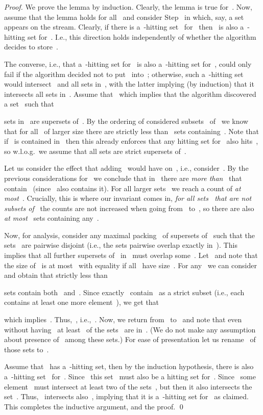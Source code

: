 \documentclass[draft,a4paper]{llncs}
\begin{document}
\begin{proof}
We prove the lemma by induction. Clearly, the lemma is true for~. Now, assume that the lemma holds for all~ and consider Step~ in which, say, a set~ appears on the stream.
Clearly, if there is a~-hitting set~ for~ then~ is also a~-hitting set for~. I.e., this direction holds independently of whether the algorithm decides to store~.

The converse, i.e., that a~-hitting set for~ is also a~-hitting set for~, could only fail if the algorithm decided not to put~ into~; otherwise, such a~-hitting set~ would intersect~ and all sets in~, with the latter implying (by induction) that it intersects all sets in~. Assume that~ which implies that the algorithm discovered a set~ such that

sets in~ are supersets of~. By the ordering of considered subsets~ of~ we know that for all~ of larger size there are strictly less than~ sets containing~. Note that if~ is contained in~ then this already enforces that any hitting set for~ also hits~, so w.l.o.g.\ we assume that all sets are strict supersets of~.

Let us consider the effect that adding~ would have on~, i.e., consider~. By the previous considerations for~ we conclude that in~ there are \emph{more than}~ that contain~ (since~ also contains it). For all larger sets~ we reach a count of \emph{at most}~. Crucially, this is where our invariant comes in, \emph{for all sets~ that are not subsets of~} the counts are not increased when going from~ to~, so there are also \emph{at most}~ sets containing any~.

Now, for analysis, consider any maximal packing~ of supersets of~ such that the sets~ are pairwise disjoint (i.e., the sets pairwise overlap exactly in~). This implies that all further supersets of~ in~ must overlap some~. Let~ and note that the size of~ is at most~ with equality if all~ have size~. For any~ we can consider~ and obtain that strictly less than

sets contain both~ and~. Since exactly~ contain~ as a strict subset (i.e., each contains at least one more element~), we get that

which implies~. Thus,~, i.e.,~. Now, we return from~ to~ and note that even without having~ at least~ of the sets~ are in~. (We do not make any assumption about presence of~ among these sets.) For ease of presentation let us rename~ of those sets to~.

Assume that~ has a~-hitting set, then by the induction hypothesis, there is also a~-hitting set~ for~. Since~ this set~ must also be a hitting set for~. Since~ some element~ must intersect at least two of the sets~, but then it also intersects the set~. Thus,~ intersects also~, implying that it is a~-hitting set for~ as claimed. This completes the inductive argument, and the proof.
\qed \end{proof}
\end{document}
